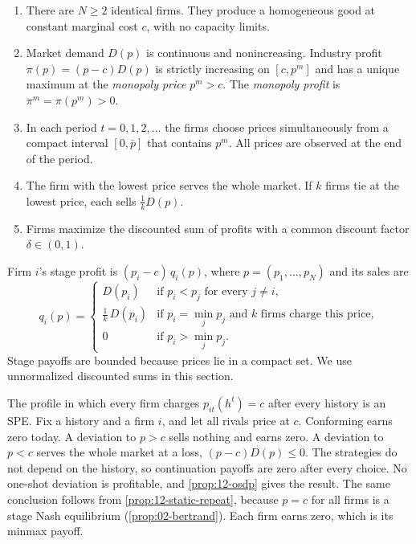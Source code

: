 \begin{assumption}\label{asm:12-bertrand}
\begin{enumerate}[label=(\roman*)]
\item There are $N \ge 2$ identical firms. They produce a homogeneous good at constant marginal cost $c$, with no
  capacity limits.
\item Market demand $D(p)$ is continuous and nonincreasing. Industry profit $\pi(p) = (p - c)D(p)$ is strictly
  increasing on $[c, p^m]$ and has a unique maximum at the \emph{monopoly price} $p^m > c$. The \emph{monopoly
  profit} is $\pi^m = \pi(p^m) > 0$.
\item In each period $t = 0, 1, 2, \dots$ the firms choose prices simultaneously from a compact interval
  $[0, \bar p]$ that contains $p^m$. All prices are observed at the end of the period.
\item The firm with the lowest price serves the whole market. If $k$ firms tie at the lowest price, each sells
  $\frac{1}{k}D(p)$.
\item Firms maximize the discounted sum of profits with a common discount factor $\delta \in (0, 1)$.
\end{enumerate}
\end{assumption}

Firm $i$'s stage profit is $(p_i - c)\,q_i(p)$, where $p = (p_1, \dots, p_N)$ and its sales are
\begin{equation}\label{eq:12-bertrand-sales}
q_i(p) =
\begin{cases}
D(p_i) & \text{if } p_i < p_j \text{ for every } j \ne i, \\[2pt]
\frac{1}{k}\,D(p_i) & \text{if } p_i = \min_j p_j \text{ and } k \text{ firms charge this price}, \\[2pt]
0 & \text{if } p_i > \min_j p_j .
\end{cases}
\end{equation}
Stage payoffs are bounded because prices lie in a compact set. We use unnormalized discounted sums in this section.

\begin{example}\label{ex:12-bertrand-nash}
The profile in which every firm charges $p_{it}(h^t) = c$ after every history is an SPE. Fix a history and a firm $i$,
and let all rivals price at $c$. Conforming earns zero today. A deviation to $p > c$ sells nothing and earns zero. A
deviation to $p < c$ serves the whole market at a loss, $(p - c)D(p) \le 0$. The strategies do not depend on the
history, so continuation payoffs are zero after every choice. No one-shot deviation is profitable, and
\cref{prop:12-osdp} gives the result. The same conclusion follows from \cref{prop:12-static-repeat}, because $p = c$
for all firms is a stage Nash equilibrium (\cref{prop:02-bertrand}). Each firm earns zero, which is its minmax payoff.
\end{example}

